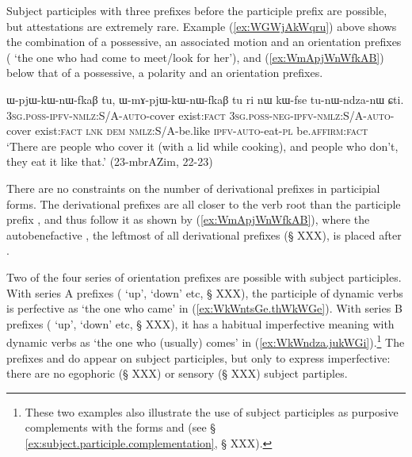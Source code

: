 Subject participles with three prefixes before the participle prefix  are possible, but attestations are extremely rare. Example (\ref{ex:WGWjAkWqru}) above shows the combination of a possessive, an associated motion and an orientation prefixes ( `the one who had come to meet/look for her'), and (\ref{ex:WmApjWnWfkAB}) below that of a possessive, a polarity and an orientation prefixes.

\begin{exe}
\ex \label{ex:WmApjWnWfkAB}
 \gll ɯ-pjɯ-kɯ-nɯ-fkaβ tu, ɯ-mɤ-pjɯ-kɯ-nɯ-fkaβ tu ri nɯ kɯ-fse tu-nɯ-ndza-nɯ ɕti. \\
 \textsc{3sg}.\textsc{poss}-\textsc{ipfv}-\textsc{nmlz}:S/A-\textsc{auto}-cover exist:\textsc{fact}  \textsc{3sg}.\textsc{poss}-\textsc{neg}-\textsc{ipfv}-\textsc{nmlz}:S/A-\textsc{auto}-cover exist:\textsc{fact} \textsc{lnk} \textsc{dem} \textsc{nmlz}:S/A-be.like \textsc{ipfv}-\textsc{auto}-eat-\textsc{pl} be.\textsc{affirm}:\textsc{fact} \\
 \glt `There are people who cover it (with a lid while cooking), and people who don't, they eat it like that.' (23-mbrAZim, 22-23)
\end{exe}

There are no constraints on the number of derivational prefixes in participial forms. The derivational prefixes are all closer to the verb root than the participle prefix , and thus follow it as shown by (\ref{ex:WmApjWnWfkAB}), where the autobenefactive , the leftmost of all derivational prefixes (§ XXX), is placed after . 

Two of the four series of orientation prefixes are possible with subject participles. With series A prefixes ( `up',  `down' etc, § XXX), the participle of dynamic verbs is perfective as  `the one who came' in (\ref{ex:WkWntsGe.thWkWGe}). With series B prefixes ( `up',  `down' etc, § XXX), it has a habitual imperfective meaning with dynamic verbs as  `the one who (usually) comes' in (\ref{ex:WkWndza.jukWGi}).\footnote{These two examples also illustrate the use of subject participles as purposive complements with the forms  and  (see § \ref{ex:subject.participle.complementation}, § XXX).} The prefixes and  do appear on subject participles, but only to express imperfective: there are no egophoric (§ XXX) or sensory (§ XXX) subject partiples.

